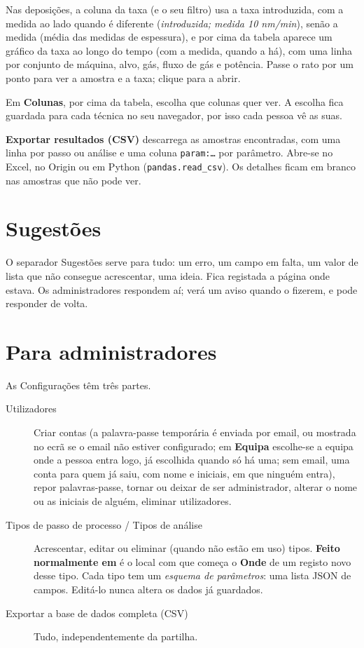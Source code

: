 \documentclass[11pt,a4paper]{article}
\newcommand{\ui}[1]{\textsf{\textbf{#1}}}
\newcommand{\menu}[1]{\textsf{#1}}
\begin{document}
Nas deposições, a coluna da taxa (e o seu filtro) usa a taxa introduzida,
com a medida ao lado quando é diferente (\emph{introduzida; medida 10
nm/min}), senão a medida (média das medidas de espessura), e por cima da
tabela aparece um gráfico da taxa ao longo do tempo (com a medida, quando a
há), com uma linha por
conjunto de máquina, alvo, gás, fluxo de gás e potência. Passe o rato por um
ponto para ver a amostra e a taxa; clique para a abrir.

Em \ui{Colunas}, por cima da tabela, escolha que colunas quer ver. A escolha
fica guardada para cada técnica no seu navegador, por isso cada pessoa vê as
suas.

\ui{Exportar resultados (CSV)} descarrega as amostras encontradas, com uma
linha por passo ou análise e uma coluna \texttt{param:\ldots} por
parâmetro. Abre-se no Excel, no Origin ou em Python
(\texttt{pandas.read\_csv}). Os detalhes ficam em branco nas amostras que
não pode ver.

\section{Sugestões}

O separador \menu{Sugestões} serve para tudo: um erro, um campo em falta,
um valor de lista que não consegue acrescentar, uma ideia. Fica registada
a página onde estava. Os administradores respondem aí; verá um aviso
quando o fizerem, e pode responder de volta.

\section{Para administradores}
\label{sec:admin}

As \menu{Configurações} têm três partes.

\begin{description}
  \item[Utilizadores] Criar contas (a palavra-passe temporária é enviada
    por email, ou mostrada no ecrã se o email não estiver configurado; em
    \ui{Equipa} escolhe-se a equipa onde a pessoa entra logo, já escolhida
    quando só há uma; sem email, uma conta para quem já saiu, com nome e
    iniciais, em que ninguém entra),
    repor palavras-passe, tornar ou deixar de ser administrador, alterar o
    nome ou as iniciais de alguém, eliminar utilizadores.
  \item[Tipos de passo de processo / Tipos de análise] Acrescentar, editar
    ou eliminar (quando não estão em uso) tipos. \ui{Feito normalmente em}
    é o local com que começa o \ui{Onde} de um registo novo desse tipo.
    Cada tipo tem um
    \emph{esquema de parâmetros}: uma lista JSON de campos. Editá-lo nunca
    altera os dados já guardados.
  \item[Exportar a base de dados completa (CSV)] Tudo, independentemente
    da partilha.
\end{description}
\end{document}
